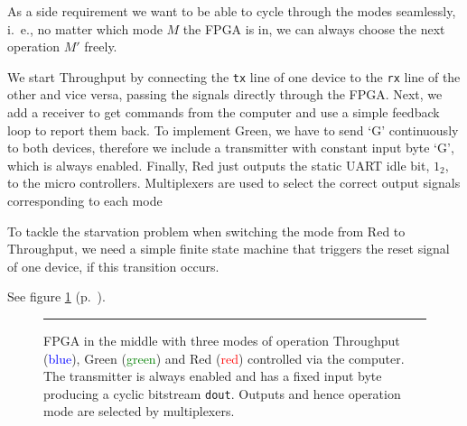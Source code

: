 As a side requirement we want to be able to cycle through the modes seamlessly, i.~e., no matter which mode $M$ the FPGA is in, we can always choose the next operation $M'$ freely.

We start \textsf{Throughput} by connecting the \texttt{tx} line of one device to the \texttt{rx} line of the other and vice versa, passing the signals directly through the FPGA. 
Next, we add a receiver to get commands from the computer and use a simple feedback loop to report them back. 
To implement \textsf{Green}, we have to send `G' continuously to both devices, therefore we include a transmitter with constant input byte `G', which is always enabled.
Finally, \textsf{Red} just outputs the static UART idle bit, $1_2$, to the micro controllers. 
Multiplexers are used to select the correct output signals corresponding to each mode 

To tackle the starvation problem when switching the mode from \textsf{Red} to \textsf{Throughput}, we need a simple finite state machine that triggers the reset signal of one device, if this transition occurs.

See figure \ref{fig:as3-schematic} (p.~\pageref{fig:as3-schematic}).

\begin{figure}[tb]
    \begin{center}
        
        \caption{FPGA in the middle with three modes of operation \textsf{Throughput} (\textcolor{blue}{blue}), \textsf{Green} (\textcolor{green}{green}) and \textsf{Red} (\textcolor{red}{red}) controlled via the computer. The transmitter is always enabled and has a fixed input byte producing a cyclic bitstream \texttt{dout}. Outputs and hence operation mode are selected by multiplexers.}
        \label{fig:as3-schematic}
        \vspace{1em}\hrule
    \end{center}
\end{figure}
